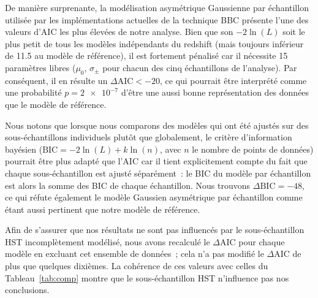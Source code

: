 \documentclass[../main/main.tex]{subfiles}
\begin{document}
De manière surprenante, la modélisation asymétrique Gaussienne par échantillon
utilisée par les implémentations actuelles de la technique BBC
\citep{scolnic2016, kessler2017} présente l'une des valeurs d'AIC les plus
élevées de notre analyse. Bien que son $-2\ln(L)$ soit le plus petit de tous les
modèles indépendants du redshift (mais toujours inférieur de \num{11.5} au
modèle de référence), il est fortement pénalisé car il nécessite 15 paramètres
libres ($\mu_0$, $\sigma_{\pm}$ pour chacun des cinq échantillons de l'analyse).
Par conséquent, il en résulte un $\Delta\mathrm{AIC} < -20$, ce qui pourrait
être interprété comme une probabilité $p = \num{2e-7}$ d'être une aussi bonne
représentation des données que le modèle de référence.

Nous notons que lorsque nous comparons des modèles qui ont été ajustés sur des
sous-échantillons individuels plutôt que globalement, le critère d'information
bayésien ($\mathrm{BIC} = -2\ln(L) + k\ln(n)$, avec $n$ le nombre de points de
données) pourrait être plus adapté que l'AIC car il tient explicitement compte
du fait que chaque sous-échantillon est ajusté séparément~: le BIC du modèle par
échantillon est alors la somme des BIC de chaque échantillon. Nous trouvons
$\Delta\mathrm{BIC} = -48$, ce qui réfute également le modèle Gaussien
asymétrique par échantillon comme étant aussi pertinent que notre modèle de
référence.

Afin de s'assurer que nos résultats ne sont pas influencés par le
sous-échantillon HST incomplètement modélisé, nous avons recalculé le
$\Delta$AIC pour chaque modèle en excluant cet ensemble de données~; cela n'a
pas modifié le $\Delta$AIC de plus que quelques dixièmes. La cohérence de ces
valeurs avec celles du Tableau~\ref{tab:comp} montre que le sous-échantillon HST
n'influence pas nos conclusions.
\end{document}
